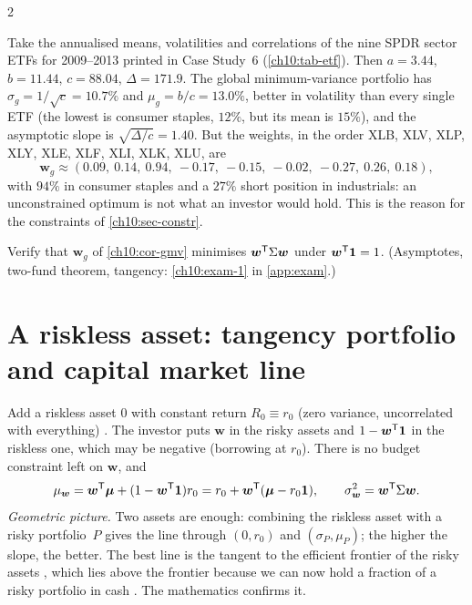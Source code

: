 \begin{paracol}{2}
\begin{example}\label{ch10:ex-etf-unc}
Take the annualised means, volatilities and correlations of the nine SPDR sector ETFs for 2009--2013 printed in
Case Study~6 (\cref{ch10:tab-etf}). Then $a=3.44$, $b=11.44$, $c=88.04$, $\Delta=171.9$. The global minimum-variance
portfolio has $\sigma_g=1/\sqrt c=10.7\%$ and $\mu_g=b/c=13.0\%$, better in volatility than every single ETF
(the lowest is consumer staples, $12\%$, but its mean is $15\%$), and the asymptotic slope is
$\sqrt{\Delta/c}=1.40$. But the weights, in the order XLB, XLV, XLP, XLY, XLE, XLF, XLI, XLK, XLU, are
\[
  \bm w_g\approx(0.09,\ 0.14,\ 0.94,\ -0.17,\ -0.15,\ -0.02,\ -0.27,\ 0.26,\ 0.18),
\]
with $94\%$ in consumer staples and a $27\%$ short position in industrials: an unconstrained optimum is not
what an investor would hold. This is the reason for the constraints of \cref{ch10:sec-constr}.
\end{example}

\begin{exercise}\label{ch10:exam-1-short}
Verify that $\bm w_g$ of \cref{ch10:cor-gmv} minimises $\bm w^{\mathsf T}\Sigma\bm w$ under $\bm w^{\mathsf T}\bm 1=1$. (Asymptotes, two-fund theorem, tangency: \cref{ch10:exam-1} in \cref{app:exam}.)
\end{exercise}

\section{A riskless asset: tangency portfolio and capital market line}\label{ch10:sec-rf}

Add a riskless asset $0$ with constant return $R_0\equiv r_0$ (zero variance, uncorrelated with everything)
. The investor puts $\bm w$ in the risky assets and $1-\bm w^{\mathsf T}\bm 1$ in the riskless one, which
may be negative (borrowing at $r_0$). There is no budget constraint left on $\bm w$, and
\begin{equation}\label{ch10:eq-mvrf}
  \mu_{\bm w}=\bm w^{\mathsf T}\bm\mu+(1-\bm w^{\mathsf T}\bm 1)r_0=r_0+\bm w^{\mathsf T}(\bm\mu-r_0\bm 1),\qquad \sigma_{\bm w}^2=\bm w^{\mathsf T}\Sigma\bm w .
\end{equation}
\emph{Geometric picture.} Two assets are enough: combining the riskless asset with a risky portfolio~$P$ gives the
line through $(0,r_0)$ and $(\sigma_P,\mu_P)$; the higher the slope, the better. The best line is the tangent to
the efficient frontier of the risky assets , which lies above the frontier
because we can now hold a fraction of a risky portfolio in cash . The mathematics confirms it.


\end{paracol}

